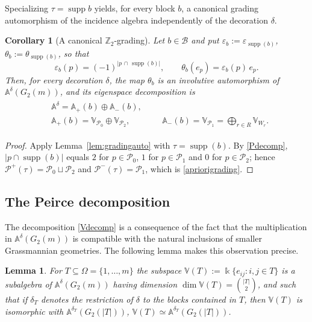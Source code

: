 \documentclass[10pt,a4paper]{amsart}
\newtheorem{lemma}[theorem]{Lemma}
\newtheorem{corollary}[theorem]{Corollary}
\numberwithin{equation}{section}
\newcommand\fie{\Bbbk}
\def\alg{\mathbb{A}}
\def\valg{\mathbb{V}}
\DeclareMathOperator{\supp}{supp}
\begin{document}
Specializing $\tau=\supp{b}$ yields, for every block $b$, a canonical grading automorphism of the incidence
algebra independently of the decoration $\delta$.

\begin{corollary}[A canonical $\mathbb Z_2$-grading]
\label{cor:gradingauto}
Let $b\in\mathcal B$ and put
$\varepsilon_b:=\varepsilon_{\supp(b)}$, $\theta_b:=\theta_{\supp(b)}$,
so that
\begin{equation}\label{epsilonmap}
\varepsilon_b(p)=(-1)^{|p\,\cap\,\supp(b)|},
\qquad
\theta_b(e_p)=\varepsilon_b(p)\,e_p .
\end{equation}
Then, for every decoration $\delta$, the map $\theta_b$ is an involutive
automorphism of $\alg^\delta(G_2(m))$, and its eigenspace decomposition
is
\begin{align}\label{apriorigrading}
\begin{aligned}
&\alg^\delta=\alg_{+}(b)\oplus\alg_{-}(b),\\
&\alg_{+}(b)=\valg_{\mathcal P_0}\oplus\valg_{\mathcal P_2},&&
&\alg_{-}(b)=\valg_{\mathcal P_1}=\bigoplus_{r\in R}\valg_{W_r} .
\end{aligned}
\end{align}
\end{corollary}

\begin{proof}
Apply Lemma~\ref{lem:gradingauto} with $\tau=\supp(b)$. By
\eqref{Pdecomp}, $|p\cap\supp(b)|$ equals $2$ for $p\in\mathcal P_0$,
$1$ for $p\in\mathcal P_1$ and $0$ for $p\in\mathcal P_2$; hence
$\mathcal P^{+}(\tau)=\mathcal P_0\sqcup\mathcal P_2$ and
$\mathcal P^{-}(\tau)=\mathcal P_1$, which is \eqref{apriorigrading}.
\end{proof}


\subsection{The Peirce decomposition}
The decomposition \eqref{Vdecomp} is  a consequence of the fact that the multiplication in $\alg^\delta(G_2(m))$ is compatible with the natural inclusions of smaller Grassmannian geometries. The following lemma makes this observation precise.

\begin{lemma}\label{lem:closure}
For $T\subseteq\Omega=\{1,\dots,m\}$ the subspace
$\valg(T):=\fie\{e_{ij}: i,j\in T\}$ is a subalgebra of $\alg^\delta(G_2(m))$ having dimension $
\dim \valg(T)=\binom{|T|}{2}$, and such that if $\delta_T$ denotes the restriction of $\delta$ to the blocks contained in $T$, then $\valg(T)$ is isomorphic with $\alg^{\delta_T}(G_2(|T|))$,
$\valg(T)\simeq\alg^{\delta_T}(G_2(|T|))$.
\end{lemma}
\end{document}
